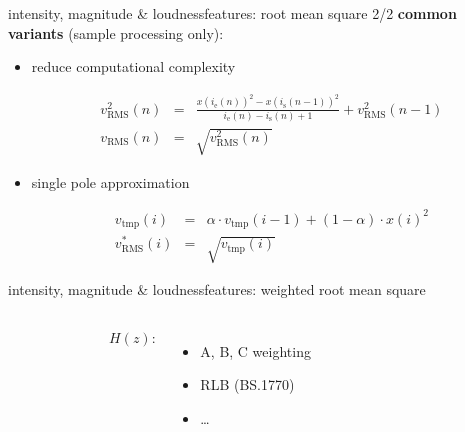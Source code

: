         \begin{frame}{intensity, magnitude \& loudness}{features: root mean square 2/2}
                \textbf{common variants}  (sample processing only):
                \begin{itemize}
                    \item<1->	reduce computational complexity
                        \begin{footnotesize}
                        \begin{eqnarray*}
                            v^2_{\mathrm{RMS}}(n) &=& \frac{x(i_{\mathrm{e}}(n))^2 - x(i_{\mathrm{s}}(n-1))^2}{i_{\mathrm{e}}(n)-i_{\mathrm{s}}(n) + 1} + v^2_{\mathrm{RMS}}(n-1) \\
                            v_{\mathrm{RMS}}(n)	&=& \sqrt{v^2_{\mathrm{RMS}}(n)}
                        \end{eqnarray*}
                        \end{footnotesize}
                    \smallskip
                    \item<2->	single pole approximation
                        \begin{footnotesize}
                        \begin{eqnarray*}
                            v_\mathrm{tmp}(i)	&=& \alpha\cdot v_\mathrm{tmp}(i-1) + (1-\alpha)\cdot x(i)^2\\
                            v^*_{\mathrm{RMS}}(i)		&=& \sqrt{v_\mathrm{tmp}(i)}
                        \end{eqnarray*}
                        \end{footnotesize}
                \end{itemize}
        \end{frame}
        \begin{frame}{intensity, magnitude \& loudness}{features: weighted root mean square}
            \begin{columns}
                \vspace{-8mm}
                \begin{figure}
                    \centering
                    
                \end{figure}
             $H(z)$:
            \begin{itemize}
                \item	A, B, C weighting
                \item	RLB (BS.1770)
                \item	\ldots
            \end{itemize}
           \end{columns}
            
        \end{frame}

